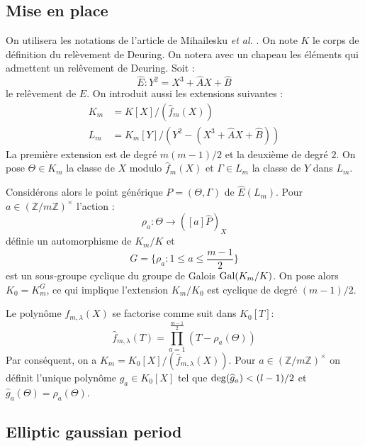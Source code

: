 \documentclass[a4paper]{article} %
\newcommand\zmodninv[1]{(\mathbb{Z}/#1\mathbb{Z})^{\times}}
\begin{document}
\subsection{Mise en place}
\label{sec:mep}
On utilisera les notations de l'article de Mihailesku \emph{et al.}
\cite{MiMoSch}. On note $K$ le corps de définition du relèvement de Deuring.
On notera avec un chapeau les éléments qui admettent un relêvement de Deuring.
Soit :
\[
\widehat{E} : Y^2 = X^3 + \widehat{A}X + \widehat{B}
\]
le relêvement de $E$. On introduit aussi les extensions suivantes : 
\begin{align*}
K_m &= K[X]/(\widehat{f}_m(X))\\
L_m &= K_m[Y]/(Y^2 - (X^3 + \widehat{A}X + \widehat{B}))
\end{align*}
La première extension est de degré $m(m-1)/2$ et la deuxième de degré $2$. On
pose $\Theta\in K_m$ la classe de $X$ modulo $\widehat{f}_m(X)$ et $\Gamma\in L_m$
la classe de $Y$ dans $L_m$.\par
Considérons alors le point générique $P = (\Theta, \Gamma)$ de $\widehat{E}(L_m)$.
Pour $a\in \zmodninv{m}$ l'action :
\[
\rho_a : \Theta \to ([a]\widehat{P})_X
\]
définie un automorphisme de $K_m/K$ et 
\[
G = \lbrace{\rho_a : 1 \leq a \leq \dfrac{m-1}{2}}\rbrace
\]
est un sous-groupe cyclique du groupe de Galois $\textup{Gal}(K_m/K)$. On
pose alors $K_0 = K_m^{G}$, ce qui implique l'extension $K_m/K_0$ est
cyclique de degré $(m-1)/2$.\par
Le polynôme $f_{m,\lambda}(X)$ se factorise comme suit dans $K_0[T]$:
\[
\widehat{f}_{m,\lambda}(T) = \prod_{a=1}^{\tfrac{m-1}{2}}{(T - \rho_a(\Theta))}
\]
Par conséquent, on a $K_m = K_0[X]/(\widehat{f}_{m,\lambda}(X))$. Pour
$a\in\zmodninv{m}$ on définit l'unique polynôme $\widehat{g}_a\in K_0[X]$ tel
que $\textup{deg}(\widehat{g}_a) < (l-1)/2$ et $\widehat{g}_a(\Theta) =
\rho_a(\Theta)$.

\subsection{Elliptic gaussian period}
\end{document}
